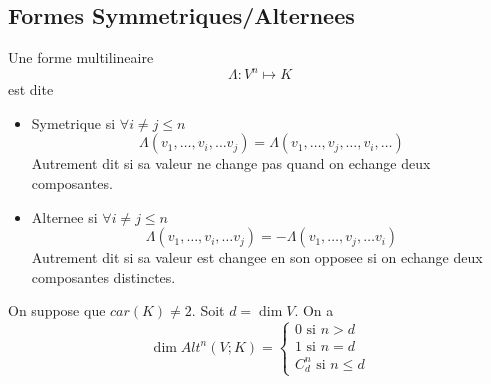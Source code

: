 \documentclass[../main.tex]{subfiles}
\begin{document}
\subsection{Formes Symmetriques/Alternees}
\begin{defn}
Une forme multilineaire
\[ 
\Lambda: V^{n}\mapsto K
\]
est dite 
\begin{itemize}
\item Symetrique si $\forall i \neq j \leq n$ 
	\[ 
		\Lambda( v_1, \ldots, v_i, \ldots v_j) = \Lambda( v_1, \ldots, v_j,\ldots, v_{i} ,\ldots) 
	\]
	Autrement dit si sa valeur ne change pas quand on echange deux composantes.
\item Alternee si $\forall i \neq j \leq n$ 
	\[ 
		\Lambda(  v_1, \ldots, v_i, \ldots v_j) = -\Lambda(  v_1, \ldots, v_j, \ldots v_i) 
	\]
	Autrement dit si sa valeur est changee en son opposee si on echange deux composantes distinctes.\\
\end{itemize}

\end{defn}
\begin{thm}
	On suppose que $car( K) \neq 2$. Soit $d= \dim V$. On a 
	\[ 
		\dim Alt^{n}( V;K) = 
		\begin{cases}
		0 \text{ si $n>d$ } \\
		1 \text{ si $n=d$ } \\
		 C^{n}_d \text{ si } n \leq d
		\end{cases}
	\]
	
\end{thm}
\end{document}
